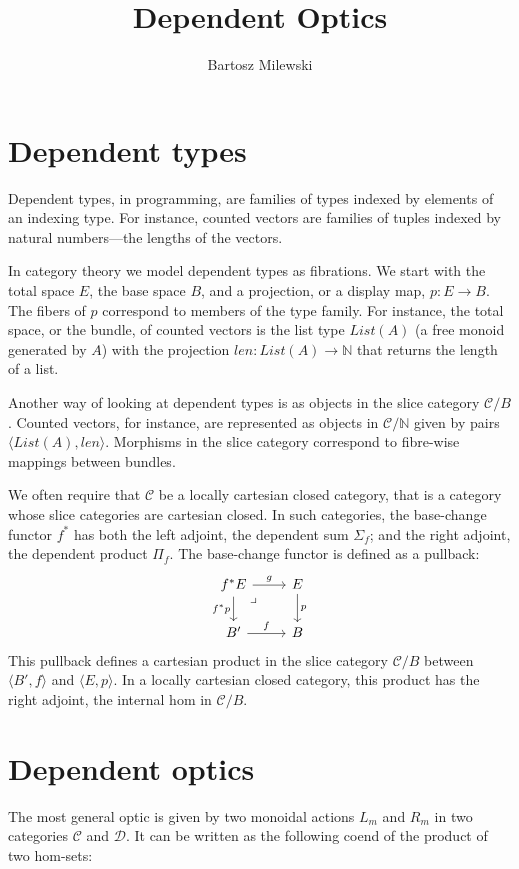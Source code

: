 \documentclass[11pt]{amsart}
\author{Bartosz Milewski}
\title{Dependent Optics}
\begin{document}
\maketitle{}

\section{Dependent types}

Dependent types, in programming, are families of types indexed by elements of an indexing type. For instance, counted vectors are families of tuples indexed by natural numbers---the lengths of the vectors.

In category theory we model dependent types as fibrations. We start with the total space $E$, the base space $B$, and a projection, or a display map, $p \colon E \to B$. The fibers of $p$ correspond to members of the type family. For instance, the total space, or the bundle, of counted vectors is the list type $\mathit{List} (A)$ (a free monoid generated by $A$) with the projection $\mathit{len} \colon \mathit{List} (A) \to \mathbb{N}$ that returns the length of a list.

Another way of looking at dependent types is as objects in the slice category $\mathcal{C}/B$. Counted vectors, for instance, are represented as objects in $\mathcal{C}/\mathbb{N}$ given by pairs $\langle \mathit{List} (A), \mathit{len} \rangle$.   Morphisms in the slice category correspond to fibre-wise mappings between bundles.

We often require that $\mathcal{C}$ be a locally cartesian closed category, that is a category whose slice categories are cartesian closed. In such categories, the base-change functor $f^*$ has both the left adjoint, the dependent sum $\Sigma_f$; and the right adjoint, the dependent product $\Pi_f$. The base-change functor is defined as a pullback:
\[
 \begin{tikzcd}
f^* E
\arrow[dr, phantom,  , very near start, "\lrcorner"]
 \arrow[d, "f^*p"']
 \arrow[r, "g"]
 & E
 \arrow[d, "p"]
 \\
 B'
 \arrow[r, "f"]
 &B
  \end{tikzcd}
\]
This pullback defines a cartesian product in the slice category $\mathcal{C}/B$ between $\langle B', f \rangle$ and $\langle E, p \rangle$. In a locally cartesian closed category, this product has the right adjoint, the internal hom in $\mathcal{C}/B$.

\section{Dependent optics}
The most general optic is given by two monoidal actions $L_m$ and $R_m$ in two categories  $\mathcal{C}$ and $ \mathcal{D}$. It can be written as the following coend of the product of two hom-sets:
\end{document}
